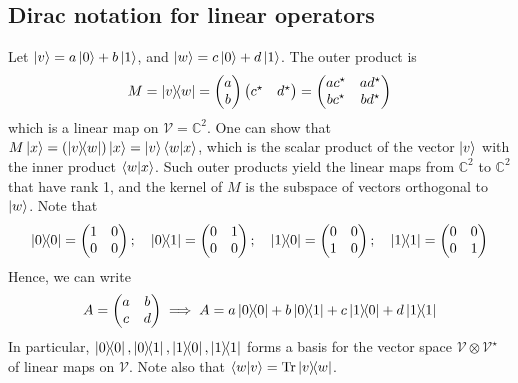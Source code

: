 \subsection{Dirac notation for linear operators}
Let \( \ket{v} = a \ket{0} + b \ket{1} \), and \( \ket{w} = c \ket{0} + d \ket{1} \).
The outer product is
\[ M = \op{v}{w} = \begin{pmatrix}
    a \\ b
\end{pmatrix} \begin{pmatrix}
    c^\star & d^\star
\end{pmatrix} = \begin{pmatrix}
    ac^\star & ad^\star \\
    bc^\star & bd^\star
\end{pmatrix} \]
which is a linear map on \( \mathcal V = \mathbb C^2 \).
One can show that \( M \ket{x} = \qty(\op{v}{w})\ket{x} = \ket{v} \ip{w}{x} \), which is the scalar product of the vector \( \ket{v} \) with the inner product \( \ip{w}{x} \).
Such outer products yield the linear maps from \( \mathbb C^2 \) to \( \mathbb C^2 \) that have rank 1, and the kernel of \( M \) is the subspace of vectors orthogonal to \( \ket{w} \).
Note that
\[ \op{0}{0} = \begin{pmatrix}
    1 & 0 \\
    0 & 0
\end{pmatrix};\quad \op{0}{1} = \begin{pmatrix}
    0 & 1 \\
    0 & 0
\end{pmatrix};\quad \op{1}{0} = \begin{pmatrix}
    0 & 0 \\
    1 & 0
\end{pmatrix};\quad \op{1}{1} = \begin{pmatrix}
    0 & 0 \\
    0 & 1
\end{pmatrix} \]
Hence, we can write
\[ A = \begin{pmatrix}
    a & b \\
    c & d
\end{pmatrix} \implies A = a \op{0}{0} + b \op{0}{1} + c \op{1}{0} + d \op{1}{1} \]
In particular, \( \op{0}{0}, \op{0}{1}, \op{1}{0}, \op{1}{1} \) forms a basis for the vector space \( \mathcal V \otimes \mathcal V^\star \) of linear maps on \( \mathcal V \).
Note also that \( \ip{w}{v} = \Tr \op{v}{w} \).

